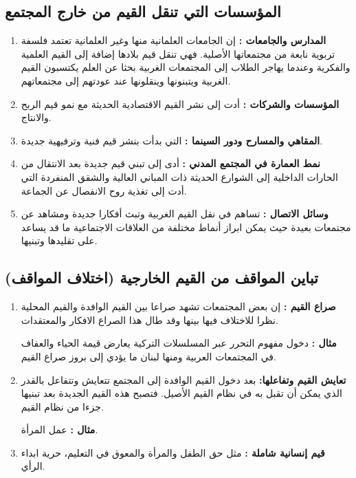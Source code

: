 \subsection{المؤسسات التي تنقل القيم من خارج المجتمع}
\begin{enumerate}
    \item\textbf{المدارس والجامعات :}
        إن الجامعات العلمانية منها وغير العلمانية تعتمد فلسفة تربوية نابعة من
        مجتمعاتها الأصلية. فهي تنقل قيم بلادها إضافة إلى القيم العلمية والفكرية
        وعندما يهاجر الطلاب إلى المجتمعات الغربية بحثا عن العلم يكتسبون القيم
        الغربية ويتبنونها وينقلونها عند عودتهم إلى مجتمعاتهم.
    \item\textbf{المؤسسات والشركات :}
        أدت إلى نشر القيم الاقتصادية الحديثة مع نمو قيم الربح والانتاج.
    \item\textbf{المقاهي والمسارح ودور السينما :}
        التي بدأت بنشر قيم فنية وترفيهية جديدة.
    \item\textbf{نمط العمارة في المجتمع المدني :}
        أدى إلى تبني قيم جديدة بعد الانتقال من الحارات الداخلية إلى الشوارع 
        الحديثة ذات المباني العالية والشقق المنفردة التي أدت إلى تغذية روح
        الانفصال عن الجماعة.
    \item\textbf{وسائل الاتصال :}
        تساهم في نقل القيم الغربية وتبث أفكارا جديدة ومشاهد عن مجتمعات بعيدة حيث
        يمكن ابراز أنماط مختلفة من العلاقات الاجتماعية ما قد يساعد على تقليدها
        وتبنيها.
\end{enumerate}

\subsection{تباين المواقف من القيم الخارجية (اختلاف المواقف)}
\begin{enumerate}
    \item\textbf{صراع القيم :}
        إن بعض المجتمعات تشهد صراعا بين القيم الوافدة والقيم المحلية نظرا للاختلاف
        فيها بينها وقد طال هذا الصراع الافكار والمعتقدات.
        \smallskip
        
        \textbf{مثال :}
        دخول مفهوم التحرر عبر المسلسلات التركية يعارض قيمة الحياء والعفاف في
        المجتمعات العربية ومنها لبنان ما يؤدي إلى بروز صراع القيم.
    \item\textbf{تعايش القيم وتفاعلها\footnotemark :}
        بعد دخول القيم الوافدة إلى المجتمع تتعايش وتتفاعل بالقدر الذي يمكن أن
        تقبل به في نظام القيم الأصيل. فتصبح هذه القيم الجديدة بعد تبنيها جزءا من
        نظام القيم.
        \smallskip
        
        \textbf{مثال :}
        عمل المرأة.
    \item\textbf{قيم إنسانية شاملة :}
        مثل حق الطفل والمرأة والمعوق في التعليم، حرية ابداء الرأي.
        
\end{enumerate}